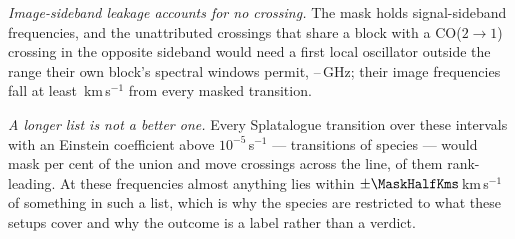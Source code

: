 \emph{Image-sideband leakage accounts for no crossing.} The mask holds
signal-sideband frequencies, and the \MkImgN{} unattributed crossings that
share a block with a CO($2\to1$) crossing in the opposite sideband would need
a first local oscillator outside the range their own block's spectral windows
permit, \MkImgLOLo--\MkImgLOHi\,GHz; their image frequencies fall at least
\MkImgDvMin\,km\,s$^{-1}$ from every masked transition.

\emph{A longer list is not a better one.} Every Splatalogue transition over
these intervals with an Einstein coefficient above $10^{-5}$\,s$^{-1}$ ---
\MaskDbTrans{} transitions of \MaskDbCarriers{} species --- would mask
\MaskDbPctUnion{} per cent of the union and move \FrFullNFlip{} crossings
across the line, \FrFullNFlipRankWord{} of them rank-leading. At these
frequencies almost anything lies within $\pm\MaskHalfKms$\,km\,s$^{-1}$ of
something in such a list, which is why the species are restricted to what
these setups cover and why the outcome is a label rather than a verdict.

